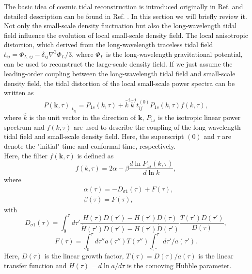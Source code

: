 The basic idea of cosmic tidal reconstruction is introduced originally in 
Ref. \citep{2012arXiv1202.5804P} and detailed description can be found in 
Ref. \citep{2016PhRvD..93j3504Z}.
In this section we will briefly review it.\\

Not only the small-scale density fluctuation but also the long-wavelength
 tidal field influence the evolution of local small-scale density field.
The local anisotropic distortion, which derived from the long-wavelength 
traceless tidal field $t_{ij}=\Phi_{L,ij}-\delta_{ij}\nabla^{2}\Phi_{L}/3$,
where $\Phi_{L}$ is the long-wavelength gravitational potential,
 can be used
to reconstruct the large-scale density field.
 If we just assume the leading-order coupling
 between the long-wavelength tidal field and small-scale density field, 
  the tidal distortion of the local small-scale power spectra can be 
  written as
\begin{equation}
P(\bm{k},\tau)|_{t_{ij}}=P_{1s}(k,\tau)+\hat{k}^{i}\hat{k}^{j}t_{ij}^{(0)}P_{1s}(k,\tau)f(k,\tau),
\label{equ:Pk_s}
\end{equation}
where $\hat{k}$ is the unit vector in the direction of $\bm{k}$, 
$P_{1s}$ is the isotropic linear power spectrum
and $f(k,\tau)$ are used to describe the coupling of the 
long-wavelength
tidal field and small-scale density field. Here, the superscript
$(0)$ and $\tau$ are denote the "initial" time and conformal time,
respectively. \\
Here, the filter $f(\bm{k},\tau)$ is defined as
\begin{equation}
f(k,\tau)=2\alpha -\beta \frac{d\ln P_{1s}(k,\tau) }{d\ln k},
\label{equ:f}
\end{equation}
where 
\begin{equation}
\begin{split}
&\alpha(\tau)=-D_{\sigma 1}(\tau)+F(\tau),\\
&\beta(\tau)=F(\tau),
\end{split}
\end{equation}
with 
\begin{equation}
D_{\sigma 1}(\tau)=\int^{\tau}_{0}d\tau'\frac{H(\tau)D(\tau')-H(\tau')D(\tau)}{\dot{H}(\tau')D(\tau')-H(\tau')\dot{D}(\tau')}\frac{T(\tau')D(\tau')}{D(\tau)},
\end{equation}
\begin{equation}
F(\tau)=\int^{\tau}_{0}d\tau''a(\tau'')T(\tau'')\int^{\tau}_{\tau''}d\tau'/a(\tau').
\end{equation}
Here, $D(\tau)$ is the linear growth factor, $T(\tau)=D(\tau)/a(\tau)$ is the linear transfer function and $H(\tau)=d\ln a/d\tau$ is the comoving Hubble parameter.\\


